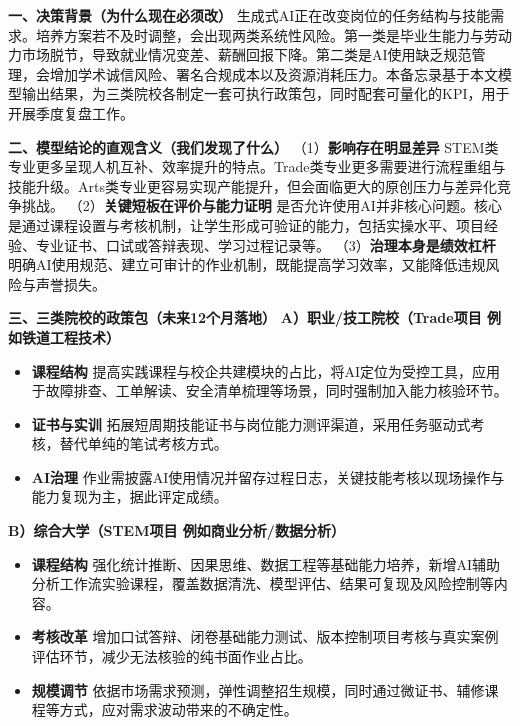 \documentclass{mcmthesis}
\begin{document}
\begin{memo}

\noindent\textbf{一、决策背景（为什么现在必须改）}
生成式AI正在改变岗位的任务结构与技能需求。培养方案若不及时调整，会出现两类系统性风险。第一类是毕业生能力与劳动力市场脱节，导致就业情况变差、薪酬回报下降。第二类是AI使用缺乏规范管理，会增加学术诚信风险、署名合规成本以及资源消耗压力。本备忘录基于本文模型输出结果，为三类院校各制定一套可执行政策包，同时配套可量化的KPI，用于开展季度复盘工作。

\vspace{4pt}
\noindent\textbf{二、模型结论的直观含义（我们发现了什么）}
（1）\textbf{影响存在明显差异} STEM类专业更多呈现人机互补、效率提升的特点。Trade类专业更多需要进行流程重组与技能升级。Arts类专业更容易实现产能提升，但会面临更大的原创压力与差异化竞争挑战。
（2）\textbf{关键短板在评价与能力证明} 是否允许使用AI并非核心问题。核心是通过课程设置与考核机制，让学生形成可验证的能力，包括实操水平、项目经验、专业证书、口试或答辩表现、学习过程记录等。
（3）\textbf{治理本身是绩效杠杆} 明确AI使用规范、建立可审计的作业机制，既能提高学习效率，又能降低违规风险与声誉损失。

\vspace{4pt}
\noindent\textbf{三、三类院校的政策包（未来12个月落地）}
\textbf{A）职业/技工院校（Trade项目 例如铁道工程技术）}
\begin{itemize}\setlength\itemsep{2pt}
\item \textbf{课程结构} 提高实践课程与校企共建模块的占比，将AI定位为受控工具，应用于故障排查、工单解读、安全清单梳理等场景，同时强制加入能力核验环节。
\item \textbf{证书与实训} 拓展短周期技能证书与岗位能力测评渠道，采用任务驱动式考核，替代单纯的笔试考核方式。
\item \textbf{AI治理} 作业需披露AI使用情况并留存过程日志，关键技能考核以现场操作与能力复现为主，据此评定成绩。
\end{itemize}

\noindent\textbf{B）综合大学（STEM项目 例如商业分析/数据分析）}
\begin{itemize}\setlength\itemsep{2pt}
\item \textbf{课程结构} 强化统计推断、因果思维、数据工程等基础能力培养，新增AI辅助分析工作流实验课程，覆盖数据清洗、模型评估、结果可复现及风险控制等内容。
\item \textbf{考核改革} 增加口试答辩、闭卷基础能力测试、版本控制项目考核与真实案例评估环节，减少无法核验的纯书面作业占比。
\item \textbf{规模调节} 依据市场需求预测，弹性调整招生规模，同时通过微证书、辅修课程等方式，应对需求波动带来的不确定性。
\end{itemize}


\end{memo}
\end{document}
